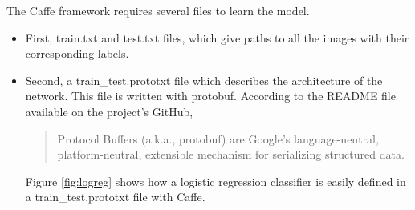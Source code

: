 The Caffe framework requires several files to learn the model.
\begin{itemize}
\item First, train.txt and test.txt files, which give paths to all the images with their corresponding labels.\newline
\item Second, a train\_test.prototxt file which describes the architecture of the network. This file is written with protobuf. According to the README file available on the project's GitHub, \blockquote{Protocol Buffers (a.k.a., protobuf) are Google's language-neutral, platform-neutral, extensible mechanism for serializing structured data.}. Figure \ref{fig:logreg} shows how a logistic regression classifier is easily defined in a train\_test.prototxt file with Caffe.


\end{itemize}
